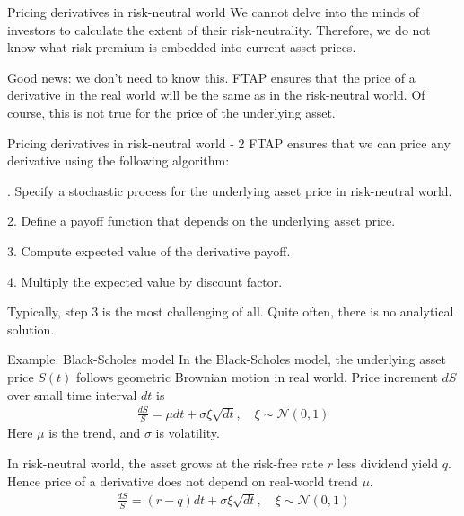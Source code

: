 \documentclass{beamer}
\begin{document}
\begin{frame}{Pricing derivatives in risk-neutral world}
\justify
We cannot delve into the minds of investors to calculate the extent of their risk-neutrality. Therefore, we do not know what risk premium is embedded into current asset prices.

\justify
Good news: we don't need to know this. FTAP ensures that the price of a derivative in the real world will be the same as in the risk-neutral world. Of course, this is not true for the price of the underlying asset.
\end{frame}



\begin{frame}{Pricing derivatives in risk-neutral world - 2}
\justify
FTAP ensures that we can price any derivative using the following algorithm:

. Specify a stochastic process for the underlying asset price in risk-neutral world.

2. Define a payoff function that depends on the underlying asset price.

3. Compute expected value of the derivative payoff.

4. Multiply the expected value by discount factor.

\justify
Typically, step 3 is the most challenging of all. Quite often, there is no analytical solution.
\end{frame}



\begin{frame}{Example: Black-Scholes model}
\justify
In the Black-Scholes model, the underlying asset price $S(t)$ follows geometric Brownian motion in real world. Price increment $dS$ over small time interval $dt$ is
\begin{align*}
\frac{dS}{S} = \mu dt + \sigma  \xi \sqrt{dt}, \quad \xi \sim \mathcal{N}(0,1) 
\end{align*}
Here $\mu$ is the trend, and $\sigma$ is volatility.

\justify
In risk-neutral world, the asset grows at the risk-free rate $r$ less dividend yield $q$. Hence price of a derivative does not depend on real-world trend $\mu$.
\begin{align*}
\frac{dS}{S} = (r - q)dt + \sigma \xi \sqrt{dt} , \quad \xi \sim \mathcal{N}(0,1) 
\end{align*}
\end{frame}
\end{document}
